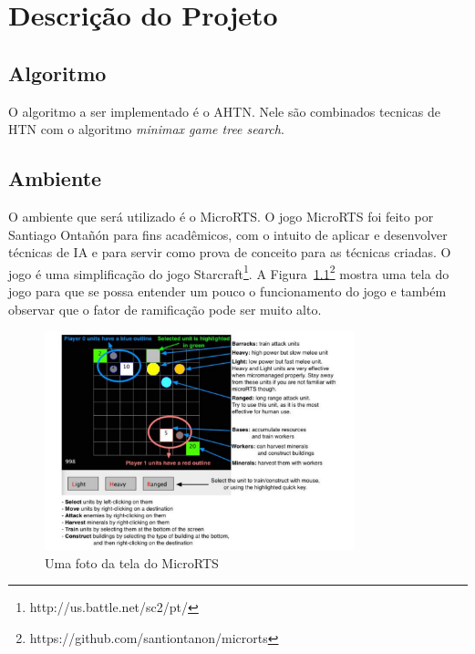 \chapter{\label{chap:descr}Descrição do Projeto}

\section{Algoritmo}
O algoritmo a ser implementado é o AHTN. Nele são combinados tecnicas de HTN com o algoritmo \textit{minimax game tree search}. 

\section{Ambiente}

O ambiente que será utilizado é o MicroRTS.  %
O jogo MicroRTS foi feito por Santiago Ontañón \cite{ontanon2013combinatorial} para fins acadêmicos, com o intuito de aplicar e desenvolver técnicas de IA e para servir como prova de conceito para as técnicas criadas.  
O jogo é uma simplificação do jogo Starcraft\footnote{http://us.battle.net/sc2/pt/}.
A Figura~\ref{fig:microrts}\footnote{https://github.com/santiontanon/microrts} mostra uma tela do jogo para que se possa entender um pouco o funcionamento do jogo e também observar que o fator de ramificação pode ser muito alto. 

\begin{figure}[ht]
	\centering
	\includegraphics[width=0.8\textwidth]{fig/microrts.pdf}
	\caption{Uma foto da tela do MicroRTS}
	\label{fig:microrts}
\end{figure} 

